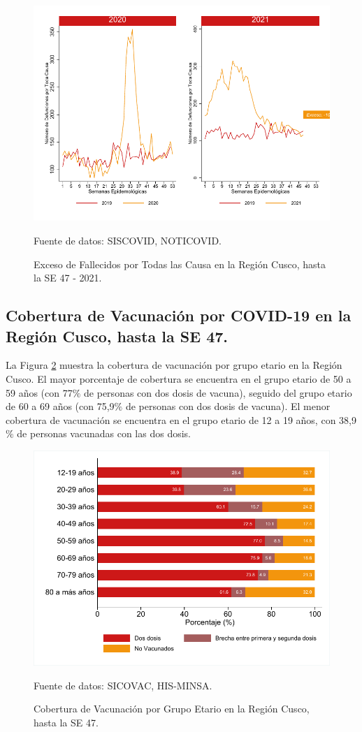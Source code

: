 \documentclass[12pt,a4paper,openany]{book}
\begin{document}
	\begin{figure}[h]
	\caption{Exceso de Fallecidos por  Todas las Causa en la Región Cusco,  hasta la SE 47 - 2021.}\label{fig:exceso_regional}
	\begin{center}
		\includegraphics[width=0.85\linewidth]{../figuras/exceso_region.pdf}
	\end{center}
	{\footnotesize {Fuente de datos: SISCOVID, NOTICOVID.}}
	\end{figure}
\clearpage

	\subsection*{Cobertura de Vacunación por COVID-19 en la Región Cusco, hasta la SE 47.}
\noindent La Figura \ref{fig:vacuna_edad} muestra la cobertura de vacunación por grupo etario en la Región Cusco. El mayor porcentaje de cobertura se encuentra en el grupo etario de 50 a 59 años (con 77$\%$ de personas con dos dosis de vacuna), seguido del grupo etario de 60 a 69 años  (con 75,9$\%$ de personas con dos dosis de vacuna). El menor cobertura de vacunación se encuentra en el grupo etario de 12 a 19 años, con 38,9$\%$ de personas vacunadas con las dos dosis. 

\begin{figure}[h]
	\caption{Cobertura de Vacunación por Grupo Etario en la Región Cusco, hasta la SE 47. }\label{fig:vacuna_edad}
	\begin{center}
		\includegraphics[width=0.65\linewidth]{../figuras/vacunacion_grupo_edad.pdf}
	\end{center}
	{\footnotesize {Fuente de datos: SICOVAC, HIS-MINSA.}}
\end{figure}
\end{document}
